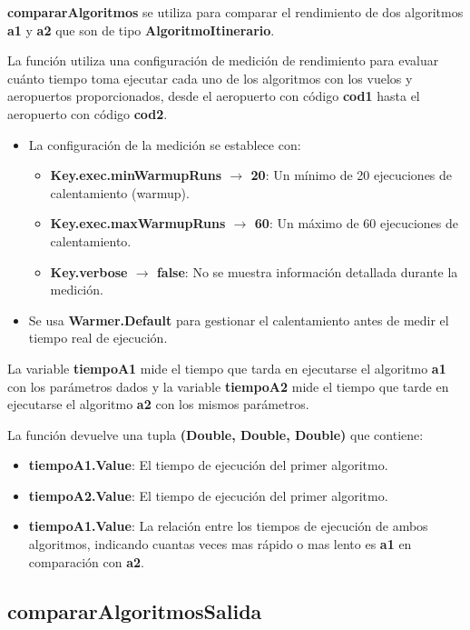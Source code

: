 \documentclass[letterpaper]{article}
\begin{document}
\textbf{compararAlgoritmos} se utiliza para comparar el rendimiento de dos algoritmos \textbf{a1} y \textbf{a2}
que son de tipo \textbf{AlgoritmoItinerario}. 

La función utiliza una configuración de medición de rendimiento para evaluar cuánto tiempo toma ejecutar cada uno de los algoritmos con los vuelos y aeropuertos proporcionados, 
desde el aeropuerto con código \textbf{cod1} hasta el aeropuerto con código \textbf{cod2}.

\begin{itemize}
  \item La configuración de la medición se establece con: 
      \begin{itemize}
      \item \textbf{Key.exec.minWarmupRuns $\rightarrow$ 20}: Un mínimo de 20 ejecuciones de calentamiento (warmup).
      \item \textbf{Key.exec.maxWarmupRuns $\rightarrow$ 60}: Un máximo de 60 ejecuciones de calentamiento. 
      \item  \textbf{Key.verbose $\rightarrow$ false}: No se muestra información detallada durante la medición.
      \end{itemize}
  \item Se usa \textbf{Warmer.Default} para gestionar el calentamiento antes de medir el tiempo real de ejecución. 
\end{itemize}

La variable \textbf{tiempoA1} mide el tiempo que tarda en ejecutarse el algoritmo \textbf{a1} con los parámetros dados y la variable \textbf{tiempoA2} mide el tiempo que tarde en ejecutarse el algoritmo \textbf{a2} con los mismos parámetros.


La función devuelve una tupla \textbf{(Double, Double, Double)} que contiene:

\begin{itemize}
    \item \textbf{tiempoA1.Value}: El tiempo de ejecución del primer algoritmo.
    \item \textbf{tiempoA2.Value}: El tiempo de ejecución del primer algoritmo.
    \item \textbf{tiempoA1.Value}: La relación entre los tiempos de ejecución de ambos algoritmos, indicando cuantas veces mas rápido o mas lento es \textbf{a1} en comparación con \textbf{a2}.
\end{itemize}


\subsection{compararAlgoritmosSalida}
\end{document}
